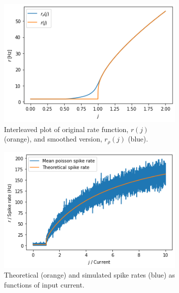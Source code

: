 \documentclass[a4paper,11pt]{article}
\begin{document}
\begin{figure}
  \hfill
  \begin{subfigure}[t]{0.32\textwidth}
    \centering
    \includegraphics[width=\textwidth]{graphics/smooth-rate.png}
    \caption{Interleaved plot of original rate function, $r(j)$ (orange), and smoothed version, $r_\rho(j)$ (blue).} 
    \label{fig:rate-function}
  \end{subfigure}
  \hfill
  \begin{subfigure}[t]{0.32\textwidth}
    \centering
    \includegraphics[width=\textwidth]{graphics/poisson.png}
    \caption{Theoretical (orange) and simulated spike rates (blue) as functions of input current.}
    \label{fig:poisson-rate}
  \end{subfigure}
  \hfill
  \begin{subfigure}[t]{0.32\textwidth}
    \centering

\end{subfigure}
\end{figure}
\end{document}
